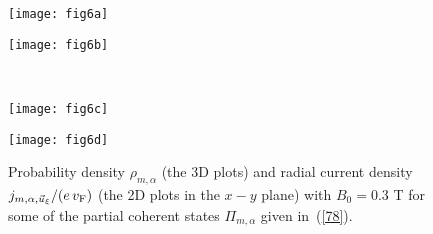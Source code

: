 \documentclass[aps,showpacs,showkeys]{revtex4}
\begin{document}
\begin{figure}[htb]
	\centering
	\begin{minipage}[b]{0.33\textwidth}
		\texttt{[image: fig6a]}\\
		\label{fig:rho_alpha1_i}
	\end{minipage}
\hspace{3cm}
	\begin{minipage}[b]{0.33\textwidth}
		\texttt{[image: fig6b]}\\
		\label{fig:jrho_alpha1_i}
	\end{minipage}
\\ [2ex]
		\begin{minipage}[b]{0.33\textwidth}
		\texttt{[image: fig6c]}\\
		\label{fig:jtheta_alpha1_i}
	\end{minipage}
\hspace{3cm}
\begin{minipage}[b]{0.33\textwidth}
	\texttt{[image: fig6d]}\\
	\label{fig:jtheta_alpha1_i}
\end{minipage}
	\caption{\label{fig:rho_alpha1} Probability density $\rho_{m,\alpha}$ (the 3D plots) and radial current density $j_{m,\alpha,\vec{u}_{\xi}}/(e\,v_{\rm F})$ (the 2D plots in the $x-y$ plane) with $B_{0}=0.3$ T for some of the partial coherent states $\Pi_{m,\alpha}$ given in~(\ref{78}).}
\end{figure}
	
	
	
	
	
\end{document}
